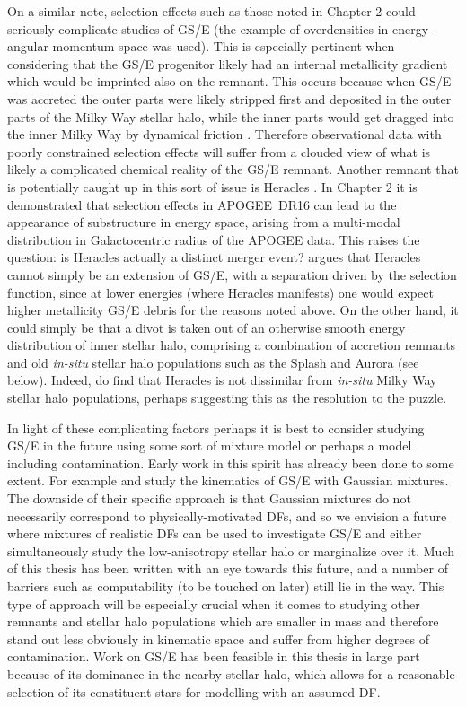 On a similar note, selection effects such as those noted in Chapter 2 could seriously complicate studies of GS/E (the example of overdensities in energy-angular momentum space was used). This is especially pertinent when considering that the GS/E progenitor likely had an internal metallicity gradient which would be imprinted also on the remnant. This occurs because when GS/E was accreted the outer parts were likely stripped first and deposited in the outer parts of the Milky Way stellar halo, while the inner parts would get dragged into the inner Milky Way by dynamical friction \parencite[e.g. see ][]{amarante22,vasiliev22}. Therefore observational data with poorly constrained selection effects will suffer from a clouded view of what is likely a complicated chemical reality of the GS/E remnant. Another remnant that is potentially caught up in this sort of issue is Heracles \parencite{horta21a}. In Chapter 2 it is demonstrated that selection effects in APOGEE~DR16 can lead to the appearance of substructure in energy space, arising from a multi-modal distribution in Galactocentric radius of the APOGEE data. This raises the question: is Heracles actually a distinct merger event? \textcite{amarante22} argues that Heracles cannot simply be an extension of GS/E, with a separation driven by the selection function, since at lower energies (where Heracles manifests) one would expect higher metallicity GS/E debris for the reasons noted above. On the other hand, it could simply be that a divot is taken out  of an otherwise smooth energy distribution of inner stellar halo, comprising a combination of accretion remnants and old \textit{in-situ} stellar halo populations such as the Splash and Aurora (see below). Indeed, \textcite{horta23a} do find that Heracles is not dissimilar from \textit{in-situ} Milky Way stellar halo populations, perhaps suggesting this as the resolution to the puzzle.

In light of these complicating factors perhaps it is best to consider studying GS/E in the future using some sort of mixture model or perhaps a model including contamination. Early work in this spirit has already been done to some extent. For example \textcite{lancaster19} and \textcite{iorio21} study the kinematics of GS/E with Gaussian mixtures. The downside of their specific approach is that Gaussian mixtures do not necessarily correspond to physically-motivated DFs, and so we envision a future where mixtures of realistic DFs can be used to investigate GS/E and either simultaneously study the low-anisotropy stellar halo or marginalize over it. Much of this thesis has been written with an eye towards this future, and a number of barriers such as computability (to be touched on later) still lie in the way. This type of approach will be especially crucial when it comes to studying other remnants and stellar halo populations which are smaller in mass and therefore stand out less obviously in kinematic space and suffer from higher degrees of contamination. Work on GS/E has been feasible in this thesis in large part because of its dominance in the nearby stellar halo, which allows for a reasonable selection of its constituent stars for modelling with an assumed DF.


